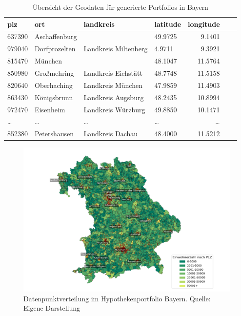\begin{table}[htbp]
    \centering
    \small  %
    \caption{Übersicht der Geodaten für generierte Portfolios in Bayern}
    \label{tab:geodatenhyp}
    \begin{tabularx}{\textwidth}{lXlXrXr}
        \toprule
        \textbf{plz} & \textbf{ort} & \textbf{landkreis} & \textbf{latitude} & \textbf{longitude} \\
        \midrule
        637390 & Aschaffenburg & & 49.9725 & 9.1401 \\
        979040 & Dorfprozelten & Landkreis Miltenberg & 4.9711 & 9.3921 \\
        815470 & München & & 48.1047 & 11.5764 \\
        850980 & Großmehring & Landkreis Eichstätt & 48.7748 & 11.5158\\
        820640 & Oberhaching & Landkreis München & 47.9859 & 11.4903 \\
        863430 & Königsbrunn & Landkreis Augsburg & 48.2435 & 10.8994 \\
        972470 & Eisenheim & Landkreis Würzburg & 49.8850 & 10.1471 \\
        \dots & \dots & \dots & \dots & \dots \\
        852380 & Petershausen & Landkreis Dachau & 48.4000 & 11.5212\\
        \bottomrule
    \end{tabularx}
\end{table} 
\FloatBarrier

\begin{figure}[htbp]
    \centering
    \includegraphics[width=\textwidth]{figures/bayern_por_pop.png} 
    \caption{Datenpunktverteilung im Hypothekenportfolio Bayern. Quelle: Eigene Darstellung}
    \label{fig:hypothekenportfolio}
\end{figure}
\FloatBarrier

